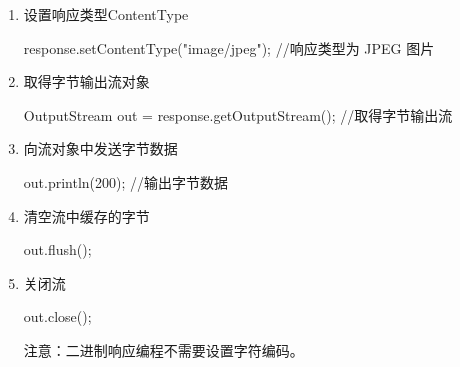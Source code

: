 \begin{enumerate}
\item 设置响应类型ContentType
  \begin{javaCode}
    response.setContentType("image/jpeg"); //响应类型为 JPEG 图片
  \end{javaCode}

\item 取得字节输出流对象
  \begin{javaCode}
    OutputStream out = response.getOutputStream(); //取得字节输出流
  \end{javaCode}

\item 向流对象中发送字节数据
  \begin{javaCode}
    out.println(200); //输出字节数据
  \end{javaCode}

\item 清空流中缓存的字节
  \begin{javaCode}
    out.flush();
  \end{javaCode}

\item 关闭流
  \begin{javaCode}
    out.close();
  \end{javaCode}

  {\Red\kai 注意：二进制响应编程不需要设置字符编码。}
\end{enumerate}